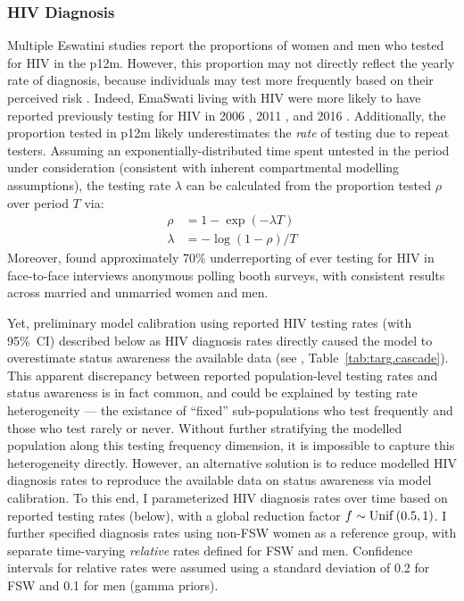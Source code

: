 \subsubsection{HIV Diagnosis}\label{model.par.cascade.dx}
Multiple Eswatini studies report the proportions of women and men who tested for HIV in the p12m.
However, this proportion may not directly reflect the yearly rate of diagnosis,
because individuals may test more frequently based on their perceived risk \cite{Witzel2017}.
Indeed, EmaSwati living with HIV were more likely to have reported previously testing for HIV in
2006 \cite[Table~14.9]{SDHS2006}, 2011 \cite[Table~5]{SHIMS1T}, and 2016 \cite[Table~7.3]{SHIMS2}.
Additionally, the proportion tested in p12m
likely underestimates the \emph{rate} of testing due to repeat testers.
Assuming an exponentially-distributed time spent untested in the period under consideration
(consistent with inherent compartmental modelling assumptions),
the testing rate $\lambda$ can be calculated
from the proportion tested $\rho$ over period $T$ via:
\begin{equation}\label{eq:exp.decay}
  \begin{aligned}
       \rho &= 1 - \exp{(-\lambda T)} \\
    \lambda &= - \log{(1-\rho)} / T
  \end{aligned}
\end{equation}
Moreover, \cite{Behanzin2013} found approximately 70\% underreporting of ever testing for HIV
in face-to-face interviews \vs anonymous polling booth surveys,
with consistent results across married and unmarried women and men.
\par
Yet, preliminary model calibration
using reported HIV testing rates (with 95\%~CI) described below as HIV diagnosis rates directly
caused the model to overestimate \hivp status awareness \vs the available data
(see , Table~\ref{tab:targ.cascade}).
This apparent discrepancy between reported population-level testing rates and \hivp status awareness
is in fact common, and could be explained by testing rate heterogeneity \cite{Maheu-Giroux2019a}
--- \ie the existance of ``fixed'' sub-populations
who test frequently and those who test rarely or never.
Without further stratifying the modelled population along this testing frequency dimension,
it is impossible to capture this heterogeneity directly.
However, an alternative solution is to reduce modelled HIV diagnosis rates
to reproduce the available data on \hivp status awareness via model calibration.
To this end, I parameterized HIV diagnosis rates over time based on reported testing rates (below),
with a global reduction factor $f \sim \operatorname{Unif}\,(0.5,1)$.
I further specified diagnosis rates using non-FSW women as a reference group,
with separate time-varying \emph{relative} rates defined for FSW and men.
Confidence intervals for relative rates were assumed using
a standard deviation of 0.2 for FSW and 0.1 for men (gamma priors).
